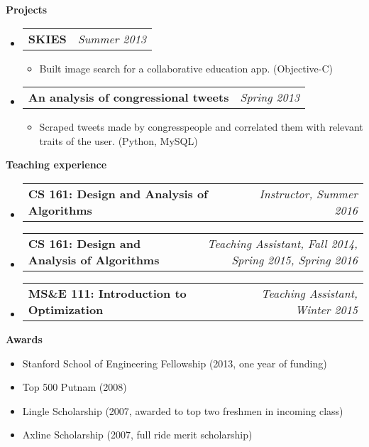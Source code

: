 \documentclass[letterpaper,10pt]{article}
\makeatletter
\newcommand{\resitem}[1]{\item #1 \vspace{-2pt}}
\newcommand{\resheading}[1]{{\large \colorbox{mygrey}{\begin{minipage}{\textwidth}{\textbf{#1 \vphantom{p\^{E}}}}\end{minipage}}}}
\newcommand{\ressubheading}[4]{
\begin{tabular*}{7.0in}{l@{\extracolsep{\fill}}r}
		\textbf{#1} & \textit{#4} \\
\end{tabular*}\vspace{-6pt}}
\makeatother
\begin{document}
\resheading{Projects}
\begin{itemize}
\item
	\ressubheading{SKIES}{Pasadena, CA}{Intern}{Summer 2013}
	\begin{itemize}
		\resitem{Built image search for a collaborative education app.  (Objective-C)}
	\end{itemize}

\item
	\ressubheading{An analysis of congressional tweets}{Pasadena, CA}{Student}{Spring 2013}
	\begin{itemize}
		\resitem{Scraped tweets made by congresspeople and correlated them with relevant traits of the user.  (Python, MySQL)}
	\end{itemize}
\end{itemize}

\resheading{Teaching experience}
\begin{itemize}
\item
	\ressubheading{CS 161: Design and Analysis of Algorithms}{Stanford, CA}{Instructor}{Instructor, Summer 2016}
\item
	\ressubheading{CS 161: Design and Analysis of Algorithms}{Stanford, CA}{Teaching Assistant}{Teaching Assistant, Fall 2014, Spring 2015, Spring 2016}
\item
	\ressubheading{MS\&E 111: Introduction to Optimization}{Stanford, CA}{Teaching Assistant}{Teaching Assistant, Winter 2015}
\end{itemize}

\resheading{Awards}
\begin{itemize}
	\item Stanford School of Engineering Fellowship (2013, one year of funding)
	\item Top 500 Putnam (2008)
	\item Lingle Scholarship (2007, awarded to top two freshmen in incoming class)
	\item Axline Scholarship (2007, full ride merit scholarship)
\end{itemize}
\end{document}
